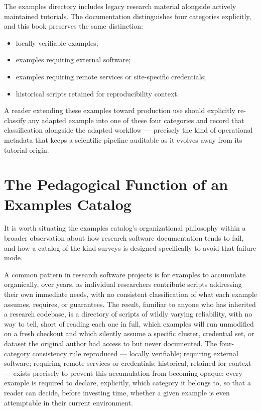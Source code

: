 The examples directory includes legacy research material alongside actively
maintained tutorials. The documentation distinguishes four categories
explicitly, and this book preserves the same distinction:

\begin{itemize}[leftmargin=1.4em]
  \item locally verifiable examples;
  \item examples requiring external software;
  \item examples requiring remote services or site-specific credentials;
  \item historical scripts retained for reproducibility context.
\end{itemize}

\begin{cautionbox}
A reader extending these examples toward production use should explicitly
re-classify any adapted example into one of these four categories and record
that classification alongside the adapted workflow --- precisely the kind of
operational metadata that keeps a scientific pipeline auditable as it
evolves away from its tutorial origin.
\end{cautionbox}

\section{The Pedagogical Function of an Examples Catalog}

It is worth situating the examples catalog's organizational philosophy
within a broader observation about how research software documentation
tends to fail, and how a catalog of the kind 
surveys is designed specifically to avoid that failure mode.

A common pattern in research software projects is for examples to
accumulate organically, over years, as individual researchers contribute
scripts addressing their own immediate needs, with no consistent
classification of what each example assumes, requires, or guarantees. The
result, familiar to anyone who has inherited a research codebase, is a
directory of scripts of wildly varying reliability, with no way to tell,
short of reading each one in full, which examples will run unmodified on a
fresh checkout and which silently assume a specific cluster, credential set,
or dataset the original author had access to but never documented. The
four-category consistency rule  reproduced ---
locally verifiable; requiring external software; requiring remote
services or credentials; historical, retained for context --- exists
precisely to prevent this accumulation from becoming opaque: every example
is required to declare, explicitly, which category it belongs to, so that a
reader can decide, before investing time, whether a given example is even
attemptable in their current environment.

